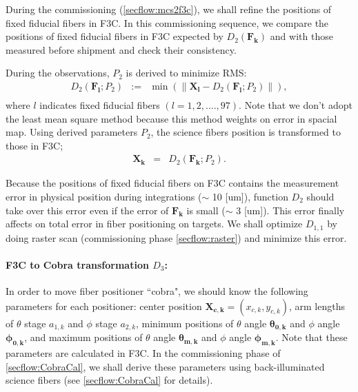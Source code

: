 During the commissioning (\ref{secflow:mcs2f3c}), we shall refine the positions of fixed fiducial fibers in F3C.
In this commissioning sequence, we compare the positions of fixed fiducial fibers in F3C expected by $D_2(\bm{F_k})$ and with those measured before shipment and check their consistency.

During the observations, $P_2$ is derived to minimize RMS:
\begin{equation}
\begin{array}{ccc}
D_{2}(\bm{F_l};P_2) &:=& \min ( \| \bm{X_l} - D_{2}(\bm{F_l};P_2) \| ), \\
\end{array}
\end{equation}
where $l$ indicates fixed fiducial fibers $(l=1,2,.... ,97)$.
Note that we don't adopt the least mean square method because this method weights on error in spacial map.
Using derived parameters $P_2$, the science fibers position is transformed to those in F3C;
\begin{equation}
\begin{array}{ccl}
\bm{X_k} & = & D_2(\bm{F_k}; P_{2}).
\end{array}
\end{equation}

Because the positions of fixed fiducial fibers on F3C contains the measurement error in physical position during integrations ($\sim$ 10 [um]),  function  $D_2$ should take over this error even if the error of $\bm{F_k}$ is small ($\sim$ 3 [um]).
This error finally affects on total error in fiber positioning on targets.
We shall optimize $D_{1,1}$ by doing raster scan (commissioning phase \ref{secflow:raster}) and minimize this error.

\paragraph{F3C to Cobra transformation $D_3$:}
In order to move fiber positioner ``cobra", we should know the following parameters for each positioner: center position $\bm{X_{c,k}}=(x_{c,k}, y_{c,k})$, arm lengths of $\theta$ stage $a_{1,k}$ and $\phi$ stage $a_{2,k}$, minimum positions of $\theta$ angle $\bm{\theta _{0,k}}$ and $\phi$ angle $\bm{\phi _{0,k}}$, and maximum positions of $\theta$ angle $\bm{\theta _{m,k}}$ and $\phi$ angle $\bm{\phi_{m,k}}$.
Note that these parameters are calculated in F3C.
In the commissioning phase of \ref{secflow:CobraCal}, we shall derive these parameters using back-illuminated science fibers (see \ref{secflow:CobraCal} for details).

